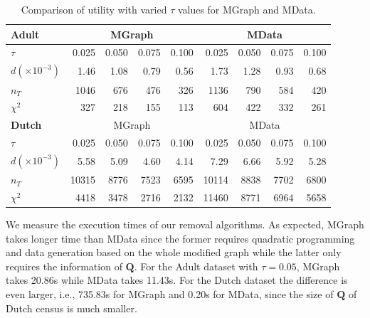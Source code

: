 \documentclass[twoside,leqno,twocolumn]{article}
\begin{document}
\begin{table}[htb]
\small
\centering
\caption{Comparison of utility  with varied $\tau$ values for MGraph and MData.}
\begin{tabular}{|l|r|r|r|r|r|r|r|r|}
	\hline
	{\bf Adult} &  \multicolumn{4}{c|}{MGraph}   &    \multicolumn{4}{c|}{MData}     \\ \hline
	$\tau$      &  0.025 & 0.050 & 0.075 & 0.100 &  0.025 &  0.050 &  0.075 &  0.100 \\ \hline
	$d(\times 10^{-3})$   &   1.46&	1.08&	0.79&	0.56&	1.73&	1.28&	0.93&	0.68 \\ \hline	
	$n_T$       &   1046 &   676 &   476 &   326 &   1136 &    790 &    584 &    420 \\ \hline
	$\chi^2$    &    327 &   218 &   155 &   113 &    604 &    422 &    332 &    261 \\ \hline\hline
	{\bf Dutch} &  \multicolumn{4}{c|}{MGraph}   &    \multicolumn{4}{c|}{MData}     \\ \hline
	$\tau$      &  0.025 & 0.050 & 0.075 & 0.100 &  0.025 &  0.050 &  0.075 &  0.100 \\ \hline
	$d(\times 10^{-3})$   & 5.58&	5.09&	4.60&	4.14&	7.29&	6.66&	5.92&	5.28 \\ \hline
	$n_T$       &  10315 &  8776 &  7523 &  6595 &  10114 &   8838 &   7702 &   6800 \\ \hline
	$\chi^2$    &   4418 &  3478 &  2716 &  2132 &  11460 &   8771 &   6964 &   5658 \\ \hline
\end{tabular}
\label{table:setting}
\end{table}

We measure the execution times of our removal algorithms. As expected, MGraph takes longer time than MData since the former requires quadratic programming and data generation based on the whole modified graph while the latter only requires the information of $\mathbf{Q}$. For the Adult dataset with $\tau = 0.05$, MGraph takes 20.86s while MData takes 11.43s. For the Dutch dataset the difference is even larger, i.e., 735.83s for MGraph and 0.20s for MData, since the size of $\mathbf{Q}$ of Dutch census is much smaller.

\end{document}
